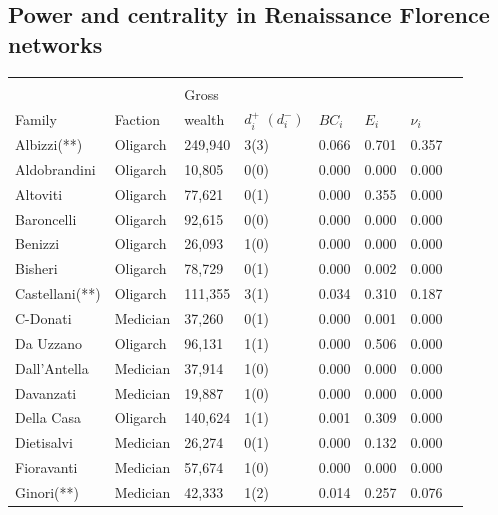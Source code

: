 \begin{subappendices}

\section{Power and centrality in Renaissance Florence networks} 
\label{A}

\begin{table}
\begin{center}
\begin{tabu} to \textwidth {X[l]  X[c]  X[c]  X[c]  X[c]  X[c]	X[c]  X[c]}
\\[-1.8ex]\hline
\hline \\[-1.8ex]
       			&   		& Gross  &  &  &  & \\
Family 			& Faction	& wealth & $d^+_i$ $\left(d^-_i\right)$ & $BC_i$	&  $E_i$	&  $\nu_i$	\\ \hline
Albizzi(**)     & Oligarch	& 249,940 	& 3(3) & 0.066 & 0.701 & 0.357      \\
Aldobrandini    & Oligarch	& 10,805  	& 0(0) & 0.000 & 0.000 & 0.000      \\
Altoviti        & Oligarch	& 77,621  	& 0(1) & 0.000 & 0.355 & 0.000      \\
Baroncelli      & Oligarch	& 92,615  	& 0(0) & 0.000 & 0.000 & 0.000      \\
Benizzi         & Oligarch	& 26,093  	& 1(0) & 0.000 & 0.000 & 0.000      \\
Bisheri         & Oligarch	& 78,729  	& 0(1) & 0.000 & 0.002 & 0.000      \\
Castellani(**)  & Oligarch	& 111,355 	& 3(1) & 0.034 & 0.310 & 0.187      \\
C-Donati        & Medician	& 37,260  	& 0(1) & 0.000 & 0.001 & 0.000      \\
Da Uzzano       & Oligarch	& 96,131  	& 1(1) & 0.000 & 0.506 & 0.000      \\
Dall'Antella    & Medician	& 37,914  	& 1(0) & 0.000 & 0.000 & 0.000      \\
Davanzati       & Medician	& 19,887  	& 1(0) & 0.000 & 0.000 & 0.000      \\
Della Casa      & Oligarch	& 140,624 	& 1(1) & 0.001 & 0.309 & 0.000      \\
Dietisalvi      & Medician	& 26,274  	& 0(1) & 0.000 & 0.132 & 0.000      \\
Fioravanti      & Medician	& 57,674  	& 1(0) & 0.000 & 0.000 & 0.000      \\
Ginori(**)      & Medician	& 42,333  	& 1(2) & 0.014 & 0.257 & 0.076      \\

\end{tabu}
\end{center}
\end{table}
\end{subappendices}
